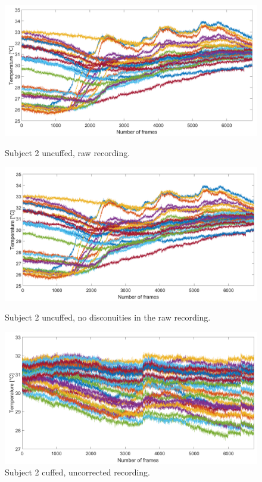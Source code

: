 \begin{figure}[htbp]
	\begin{minipage}[b]{0.45\linewidth}
		\centering
		\includegraphics[width=\linewidth]{figures/Recordings/Sub2_uncuffed_uncorr}
		\caption{Subject 2 uncuffed, raw recording.}

	\end{minipage}
	\hspace{0.2cm}
	\begin{minipage}[b]{0.45\linewidth}
		\centering
		\includegraphics[width=\linewidth]{figures/Recordings/Sub2_uncuffed_corr-no_jumps}
		\caption{Subject 2  uncuffed, no disconuities in the raw recording.}
		
	\end{minipage}
	\hspace{0.2cm}
	\begin{minipage}[b]{0.45\linewidth}
		\centering
		\includegraphics[width=\linewidth]{figures/Recordings/Sub2_cuffed_uncorr}
		\caption{Subject 2 cuffed, uncorrected recording.}
	

\end{minipage}
\end{figure}
